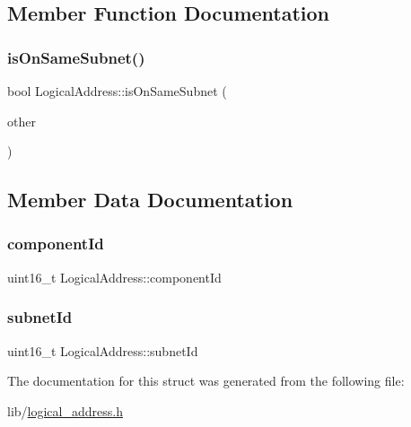 \subsection{Member Function Documentation}
\mbox{\label{structLogicalAddress_a9a8483eda7a165e0413a5b7334e47fc8}} 
\subsubsection{\texorpdfstring{is\+On\+Same\+Subnet()}{isOnSameSubnet()}}
{\footnotesize\ttfamily bool Logical\+Address\+::is\+On\+Same\+Subnet (\begin{DoxyParamCaption}\item[{\hyperlink{structLogicalAddress}{Logical\+Address}}]{other }\end{DoxyParamCaption})\hspace{0.3cm}{\ttfamily [inline]}}



\subsection{Member Data Documentation}
\mbox{\label{structLogicalAddress_ac4f97357841656cd45f3183630b7af45}} 
\subsubsection{\texorpdfstring{component\+Id}{componentId}}
{\footnotesize\ttfamily uint16\+\_\+t Logical\+Address\+::component\+Id}

\mbox{\label{structLogicalAddress_a2ea7e86b6587adbfe03b16c7e0f0fe3b}} 
\subsubsection{\texorpdfstring{subnet\+Id}{subnetId}}
{\footnotesize\ttfamily uint16\+\_\+t Logical\+Address\+::subnet\+Id}



The documentation for this struct was generated from the following file\+:\begin{DoxyCompactItemize}
\item 
lib/\hyperlink{logical__address_8h}{logical\+\_\+address.\+h}\end{DoxyCompactItemize}
